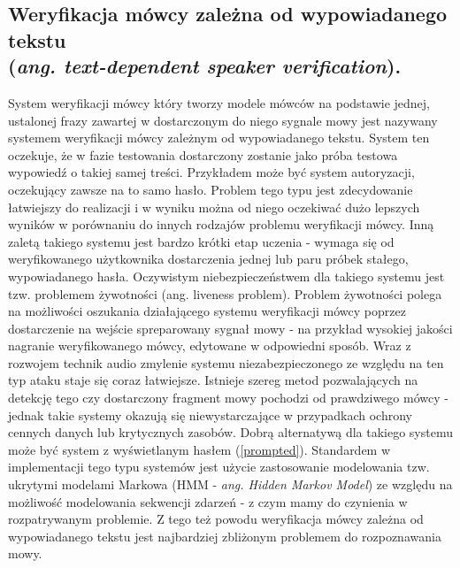 \subsection{Weryfikacja mówcy zależna od wypowiadanego tekstu \\ (\textit{ang. text-dependent speaker verification}).}
\label{liveness}

System weryfikacji mówcy który tworzy modele mówców na podstawie jednej, ustalonej frazy zawartej w dostarczonym do niego sygnale mowy jest nazywany systemem weryfikacji mówcy zależnym od wypowiadanego tekstu. System ten oczekuje, że w fazie testowania dostarczony zostanie jako próba testowa wypowiedź o takiej samej treści. Przykładem może być system autoryzacji, oczekujący zawsze na to samo hasło. Problem tego typu jest zdecydowanie łatwiejszy do realizacji i w wyniku można od niego oczekiwać dużo lepszych wyników w porównaniu do innych rodzajów problemu weryfikacji mówcy. Inną zaletą takiego systemu jest bardzo krótki etap uczenia - wymaga się od weryfikowanego użytkownika dostarczenia jednej lub paru próbek stałego, wypowiadanego hasła. Oczywistym niebezpieczeństwem dla takiego systemu jest tzw. problemem żywotności (ang. liveness problem). Problem żywotności polega na możliwości oszukania działającego systemu weryfikacji mówcy poprzez dostarczenie na wejście spreparowany sygnał mowy - na przykład wysokiej jakości nagranie weryfikowanego mówcy, edytowane w odpowiedni sposób. Wraz z rozwojem technik audio zmylenie systemu niezabezpieczonego ze względu na ten typ ataku staje się coraz łatwiejsze. Istnieje szereg metod pozwalających na detekcję tego czy dostarczony fragment mowy pochodzi od prawdziwego mówcy - jednak takie systemy okazują się niewystarczające w przypadkach ochrony cennych danych lub krytycznych zasobów. Dobrą alternatywą dla takiego systemu może być system z wyświetlanym hasłem (\ref{prompted}). Standardem w implementacji tego typu systemów jest użycie zastosowanie modelowania tzw. ukrytymi modelami Markowa (HMM - \textit{ang. Hidden Markov Model}) ze względu na możliwość modelowania sekwencji zdarzeń - z czym mamy do czynienia w rozpatrywanym problemie. Z tego też powodu weryfikacja mówcy zależna od wypowiadanego tekstu jest najbardziej zbliżonym problemem do rozpoznawania mowy.

